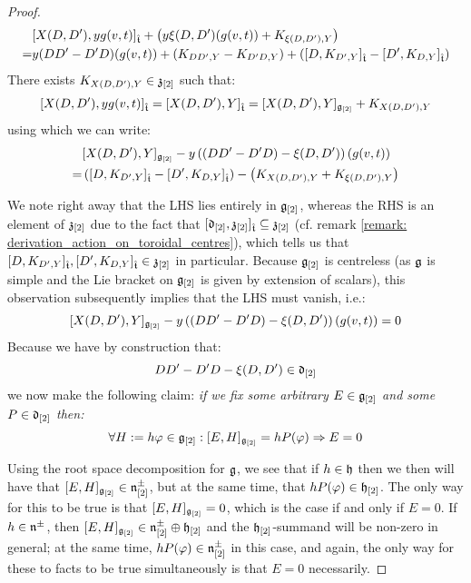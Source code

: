 \begin{proof}
                    $$
                        \begin{aligned}
                            & [ X(D, D') , y g(v, t) ]_{\hat{\mathfrak{t}}} + \left( y \xi(D, D')(g(v, t)) + K_{\xi(D, D'), Y} \right)
                            \\
                            = & y (DD' - D'D)( g(v, t) ) + ( K_{DD', Y} - K_{D'D, Y} ) + ( [ D, K_{D', Y} ]_{\hat{\mathfrak{t}}} - [ D', K_{D, Y} ]_{\hat{\mathfrak{t}}} )
                        \end{aligned}
                    $$
                There exists $K_{X(D, D'), Y} \in \mathfrak{z}_{[2]}$ such that:
                    $$[ X(D, D') , y g(v, t) ]_{\hat{\mathfrak{t}}} = [ X(D, D') , Y ]_{\hat{\mathfrak{t}}} = [X(D, D'), Y]_{\mathfrak{g}_{[2]}} + K_{X(D, D'), Y}$$
                using which we can write:
                    $$
                        \begin{aligned}
                            & [X(D, D'), Y]_{\mathfrak{g}_{[2]}} - y \left( ( DD' - D'D) - \xi(D, D') \right)( g(v, t) )
                            \\
                            = & \left( [ D, K_{D', Y} ]_{\hat{\mathfrak{t}}} - [ D', K_{D, Y} ]_{\hat{\mathfrak{t}}} \right) - \left( K_{X(D, D'), Y} + K_{\xi(D, D'), Y} \right)
                        \end{aligned}
                    $$
                    
                We note right away that the LHS lies entirely in $\mathfrak{g}_{[2]}$, whereas the RHS is an element of $\mathfrak{z}_{[2]}$ due to the fact that $[\mathfrak{d}_{[2]}, \mathfrak{z}_{[2]}]_{\hat{\mathfrak{t}}} \subseteq \mathfrak{z}_{[2]}$ (cf. remark \ref{remark: derivation_action_on_toroidal_centres}), which tells us that $[ D, K_{D', Y} ]_{\hat{\mathfrak{t}}}, [ D', K_{D, Y} ]_{\hat{\mathfrak{t}}} \in \mathfrak{z}_{[2]}$ in particular. Because $\mathfrak{g}_{[2]}$ is centreless (as $\mathfrak{g}$ is simple and the Lie bracket on $\mathfrak{g}_{[2]}$ is given by extension of scalars), this observation subsequently implies that the LHS must vanish, i.e.:
                    $$[X(D, D'), Y]_{\mathfrak{g}_{[2]}} - y \left( ( DD' - D'D) - \xi(D, D') \right)( g(v, t) ) = 0$$
                Because we have by construction that:
                    $$DD' - D'D - \xi(D, D') \in \mathfrak{d}_{[2]}$$
                we now make the following claim: \textit{if we fix some arbitrary $E \in \mathfrak{g}_{[2]}$ and some $P \in \mathfrak{d}_{[2]}$ then:}
                    $$\forall H := h \varphi \in \mathfrak{g}_{[2]}: [E, H]_{\mathfrak{g}_{[2]}} = h P( \varphi ) \Rightarrow E = 0$$

                Using the root space decomposition for $\mathfrak{g}$, we see that if $h \in \mathfrak{h}$ then we then will have that $[E, H]_{\mathfrak{g}_{[2]}} \in \mathfrak{n}^{\pm}_{[2]}$, but at the same time, that $h P(\varphi) \in \mathfrak{h}_{[2]}$. The only way for this to be true is that $[E, H]_{\mathfrak{g}_{[2]}} = 0$, which is the case if and only if $E = 0$. If $h \in \mathfrak{n}^{\pm}$, then $[E, H]_{\mathfrak{g}_{[2]}} \in \mathfrak{n}^{\pm}_{[2]} \oplus \mathfrak{h}_{[2]}$ and the $\mathfrak{h}_{[2]}$-summand will be non-zero in general; at the same time, $h P(\varphi) \in \mathfrak{n}^{\pm}_{[2]}$ in this case, and again, the only way for these to facts to be true simultaneously is that $E = 0$ necessarily. 


\end{proof}
